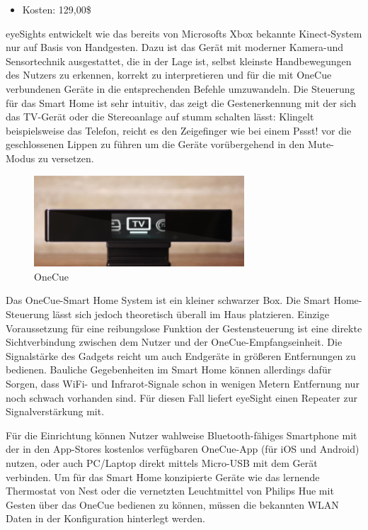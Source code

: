 \begin{itemize}
\item Kosten: 129,00\$
\end{itemize}

\noindent
eyeSights entwickelt wie das bereits von Microsofts Xbox bekannte Kinect-System nur auf Basis von Handgesten. Dazu ist das Gerät mit moderner Kamera-und Sensortechnik ausgestattet, die in der Lage ist, selbst kleinste Handbewegungen des Nutzers zu erkennen, korrekt zu interpretieren und für die mit OneCue verbundenen Geräte in die entsprechenden Befehle umzuwandeln. Die Steuerung für das Smart Home ist sehr intuitiv, das zeigt die Gestenerkennung mit der sich das TV-Gerät oder die Stereoanlage auf stumm schalten lässt: Klingelt beispielsweise das Telefon, reicht es den Zeigefinger wie bei einem \glqq Pssst!\grqq{} vor die geschlossenen Lippen zu führen um die Geräte vorübergehend in den Mute-Modus zu versetzen.

\newpage

\begin{figure}[h!]
	\centering
	\includegraphics[width=0.7\textwidth]{img/Feedback-Mechanismen/OneCue.png}
	\caption{OneCue}
	\label{fig:feedbackOneCue}
\end{figure}

Das OneCue-Smart Home System ist ein kleiner schwarzer Box. Die Smart Home-Steuerung lässt sich jedoch theoretisch überall im Haus platzieren. Einzige Voraussetzung für eine reibungslose Funktion der Gestensteuerung ist eine direkte Sichtverbindung zwischen dem Nutzer und der OneCue-Empfangseinheit. Die Signalstärke des Gadgets reicht um auch Endgeräte in größeren Entfernungen zu bedienen. Bauliche Gegebenheiten im Smart Home können allerdings dafür Sorgen, dass WiFi- und Infrarot-Signale schon in wenigen Metern Entfernung nur noch schwach vorhanden sind. Für diesen Fall liefert eyeSight einen Repeater zur Signalverstärkung mit.

Für die Einrichtung können Nutzer wahlweise Bluetooth-fähiges Smartphone mit der in den App-Stores kostenlos verfügbaren OneCue-App (für iOS und Android) nutzen, oder auch PC/Laptop direkt mittels Micro-USB mit dem Gerät verbinden. Um für das Smart Home konzipierte Geräte wie das lernende Thermostat von Nest oder die vernetzten Leuchtmittel von Philips Hue mit Gesten über das OneCue bedienen zu können, müssen die bekannten WLAN Daten in der Konfiguration hinterlegt werden.

